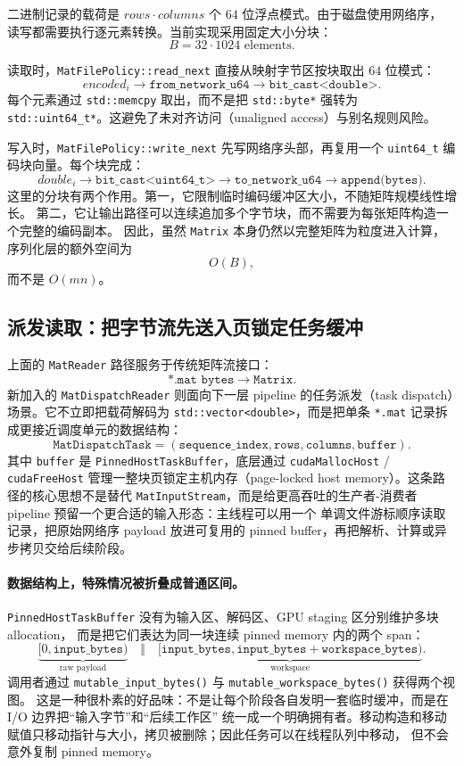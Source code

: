 二进制记录的载荷是 $rows\cdot columns$ 个 $64$ 位浮点模式。由于磁盘使用网络序，
读写都需要执行逐元素转换。当前实现采用固定大小分块：
\[
    B=32\cdot1024 \text{ elements}.
\]

读取时，\texttt{MatFilePolicy::read\_next} 直接从映射字节区按块取出 $64$ 位模式：
\[
    encoded_i \rightarrow \texttt{from\_network\_u64} \rightarrow \texttt{bit\_cast<double>}.
\]
每个元素通过 \texttt{std::memcpy} 取出，而不是把 \texttt{std::byte*} 强转为
\texttt{std::uint64\_t*}。这避免了未对齐访问（unaligned access）与别名规则风险。

写入时，\texttt{MatFilePolicy::write\_next} 先写网络序头部，再复用一个
\texttt{uint64\_t} 编码块向量。每个块完成：
\[
    double_i \rightarrow \texttt{bit\_cast<uint64\_t>} \rightarrow \texttt{to\_network\_u64}
    \rightarrow \texttt{append(bytes)}.
\]
这里的分块有两个作用。第一，它限制临时编码缓冲区大小，不随矩阵规模线性增长。
第二，它让输出路径可以连续追加多个字节块，而不需要为每张矩阵构造一个完整的编码副本。
因此，虽然 \texttt{Matrix} 本身仍然以完整矩阵为粒度进入计算，序列化层的额外空间为
\[
    O(B),
\]
而不是 $O(mn)$。

\subsection{派发读取：把字节流先送入页锁定任务缓冲}

上面的 \texttt{MatReader} 路径服务于传统矩阵流接口：
\[
    \texttt{*.mat\ bytes}
    \longrightarrow
    \texttt{Matrix}.
\]
新加入的 \texttt{MatDispatchReader} 则面向下一层 pipeline 的任务派发（task dispatch）场景。它不立即把载荷解码为
\texttt{std::vector<double>}，而是把单条 \texttt{*.mat} 记录拆成更接近调度单元的数据结构：
\[
    \texttt{MatDispatchTask}
    =
    (\texttt{sequence\_index},\texttt{rows},\texttt{columns},\texttt{buffer}).
\]
其中 \texttt{buffer} 是 \texttt{PinnedHostTaskBuffer}，底层通过 \texttt{cudaMallocHost} /
\texttt{cudaFreeHost} 管理一整块页锁定主机内存（page-locked host memory）。这条路径的核心思想不是替代
\texttt{MatInputStream}，而是给更高吞吐的生产者-消费者 pipeline 预留一个更合适的输入形态：主线程可以用一个
单调文件游标顺序读取记录，把原始网络序 payload 放进可复用的 pinned buffer，再把解析、计算或异步拷贝交给后续阶段。

\paragraph{数据结构上，特殊情况被折叠成普通区间。}
\texttt{PinnedHostTaskBuffer} 没有为输入区、解码区、GPU staging 区分别维护多块 allocation，
而是把它们表达为同一块连续 pinned memory 内的两个 span：
\[
    \underbrace{[0,\texttt{input\_bytes})}_{\text{raw payload}}
    \quad\Vert\quad
    \underbrace{[\texttt{input\_bytes},\texttt{input\_bytes}+\texttt{workspace\_bytes})}_{\text{workspace}}.
\]
调用者通过 \texttt{mutable\_input\_bytes()} 与 \texttt{mutable\_workspace\_bytes()} 获得两个视图。
这是一种很朴素的好品味：不是让每个阶段各自发明一套临时缓冲，而是在 I/O 边界把“输入字节”和“后续工作区”
统一成一个明确拥有者。移动构造和移动赋值只移动指针与大小，拷贝被删除；因此任务可以在线程队列中移动，
但不会意外复制 pinned memory。

